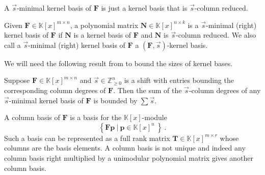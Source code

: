 A $\vec{s}$-minimal kernel basis of $\mathbf{F}$ is just a kernel
basis that is $\vec{s}$-column reduced. 
\begin{defn}
Given $\mathbf{F}\in\mathbb{K}\left[x\right]^{m\times n}$, a polynomial
matrix $\mathbf{N}\in\mathbb{K}\left[x\right]^{n\times k}$ is a $\vec{s}$-minimal
(right) kernel basis of $\mathbf{F}$ if\textbf{ $\mathbf{N}$} is
a kernel basis of $\mathbf{F}$ and $\mathbf{N}$ is $\vec{s}$-column
reduced. We also call a $\vec{s}$-minimal (right) kernel basis of
$\mathbf{F}$ a $\left(\mathbf{F},\vec{s}\right)$-kernel basis.


\end{defn}




We will need the following result from \citet{za2012} to bound the
sizes of kernel bases.
\begin{thm}
\label{thm:boundOfSumOfShiftedDegreesOfKernelBasis}Suppose $\mathbf{F}\in\mathbb{K}\left[x\right]^{m\times n}$
and $\vec{s}\in\mathbb{Z}_{\ge0}^{n}$ is a shift with entries bounding
the corresponding column degrees of $\mathbf{F}$. Then the sum of
the $\vec{s}$-column degrees of any $\vec{s}$-minimal kernel basis
of $\mathbf{F}$ is bounded by $\sum\vec{s}$. 
\end{thm}
A column basis of $\mathbf{F}$ is a basis for the $\mathbb{K}\left[x\right]$-module
\[
\left\{ \mathbf{F}\mathbf{p}~|~\mathbf{p}\in\mathbb{K}\left[x\right]^{n}~\right\} ~.
\]
 Such a basis can be represented as a full rank matrix $\mathbf{T}\in\mathbb{K}\left[x\right]^{m\times r}$
whose columns are the basis elements. A column basis is not unique
and indeed any column basis right multiplied by a unimodular polynomial
matrix gives another column basis.

